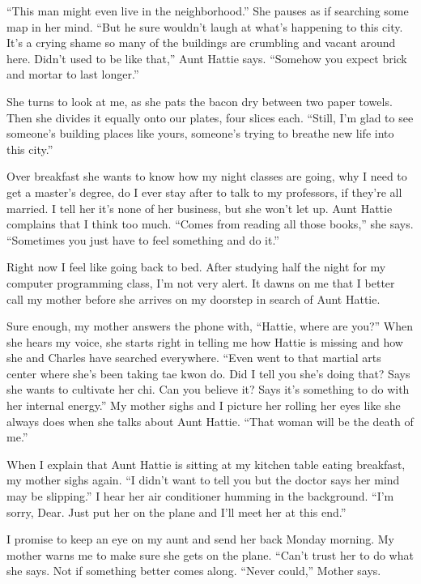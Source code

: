 \documentclass[twoside,10pt]{book}
\begin{document}
``This man might even live in the neighborhood.'' She pauses as if
searching some map in her mind. ``But he sure wouldn't laugh at what's
happening to this city. It's a crying shame so many of the buildings are
crumbling and vacant around here. Didn't used to be like that,'' Aunt
Hattie says. ``Somehow you expect brick and mortar to last longer.''

She turns to look at me, as she pats the bacon dry between two paper
towels. Then she divides it equally onto our plates, four slices each.
``Still, I'm glad to see someone's building places like yours, someone's
trying to breathe new life into this city.''

Over breakfast she wants to know how my night classes are going, why I
need to get a master's degree, do I ever stay after to talk to my
professors, if they're all married. I tell her it's none of her
business, but she won't let up. Aunt Hattie complains that I think too
much. ``Comes from reading all those books,'' she says. ``Sometimes you
just have to feel something and do it.''

Right now I feel like going back to bed. After studying half the night
for my computer program­ming class, I'm not very alert. It dawns on me
that I better call my mother before she arrives on my doorstep in search
of Aunt Hattie.

Sure enough, my mother answers the phone with, ``Hattie, where are
you?'' When she hears my voice, she starts right in telling me how
Hattie is missing and how she and Charles have searched everywhere.
``Even went to that martial arts center where she's been taking tae kwon
do. Did I tell you she's doing that? Says she wants to cultivate her
chi. Can you believe it? Says it's something to do with her internal
energy.'' My mother sighs and I picture her rolling her eyes like she
always does when she talks about Aunt Hattie. ``That woman will be the
death of me.''

When I explain that Aunt Hattie is sitting at my kitchen table eating
breakfast, my mother sighs again. ``I didn't want to tell you but the
doctor says her mind may be slipping.'' I hear her air condi­tioner
humming in the background. ``I'm sorry, Dear. Just put her on the plane
and I'll meet her at this end.''

I promise to keep an eye on my aunt and send her back Monday morning. My
mother warns me to make sure she gets on the plane. ``Can't trust her to
do what she says. Not if something better comes along. ``Never could,''
Mother says.
\end{document}
